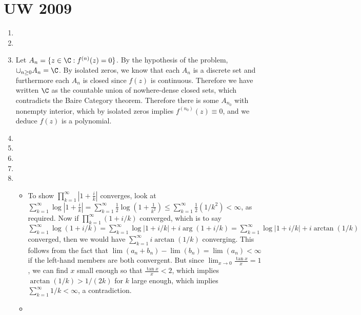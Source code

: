 \documentclass[11pt]{book}
\theoremstyle{definition}
\begin{document}
\section{UW 2009}
\begin{enumerate}
\item
\item
\item Let $A_n=\{z\in \C: f^{(n)}(z)=0\}$. By the hypothesis of the problem, $\cup _{n\geq 0} A_n=\C$. By isolated zeros, we know that each $A_n$ is a discrete set and furthermore each $A_n$ is closed since $f(z)$ is continuous. Therefore we have written $\C$ as the countable union of nowhere-dense closed sets, which contradicts the Baire Category theorem. Therefore there is some $A_{n_0}$ with nonempty interior, which by isolated zeros implies $f^{(n_0)}(z)\equiv0$, and we deduce $f(z)$ is a polynomial.	 
\item
\item
\item
\item
\item
\begin{itemize}
\item To show $\prod_{k=1}^\infty |1+\frac{i}{k}|$ converges, look at $\sum_{k=1}^\infty \log |1+\frac{i}{k}|=\sum_{k=1}^\infty \frac{1}{2}\log{(1+\frac{1}{k^2})}\leq\sum_{k=1}^\infty \frac{1}{2}(1/k^2)<\infty$, as required. Now if $\prod_{k=1}^\infty(1+i/k)$ converged, which is to say $\sum_{k=1}^\infty \log(1+i/k)=\sum_{k=1}^\infty \log|1+i/k|+i\arg(1+i/k)=\sum_{k=1}^\infty \log|1+i/k|+i\arctan(1/k)$ converged, then we would have $\sum_{k=1}^\infty i\arctan(1/k)$ converging. This follows from the fact that $\lim(a_n+b_n)-\lim(b_n)=\lim(a_n)<\infty$ if the left-hand members are both convergent. But since $\lim_{x\to0}\frac{\tan x}{x}=1$, we can find $x$ small enough so that $\frac{\tan x}{x}<2$, which implies $\arctan(1/k)>1/(2k)$ for $k$ large enough, which implies $\sum_{k=1}^\infty 1/k<\infty$, a contradiction.
\item 
\end{itemize}
\end{enumerate}
\end{document}
